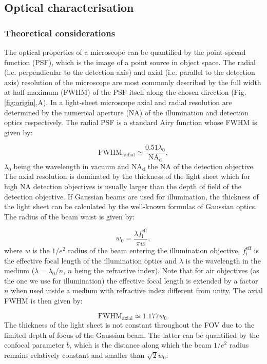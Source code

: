 \documentclass[12pt]{spieman}  %
\begin{document}
\begin{spacing}{2}
\subsection{Optical characterisation}
\label{sec:characterisation}
\subsubsection{Theoretical considerations}

The optical properties of a microscope can be quantified by the point-spread function (PSF), which is the image of a point source in object space. The radial (i.e. perpendicular to the detection axis) and axial (i.e. parallel to the detection axis) resolution of the microscope are most commonly described by the full width at half-maximum (FWHM) of the PSF itself along the chosen direction (Fig. \ref{fig:origin},A). In a light-sheet microscope axial and radial resolution are determined by the numerical aperture (NA) of the illumination and detection optics respectively. The radial PSF is a standard Airy function whose FWHM is given by:

\begin{equation}
\text{FWHM}_{\text{radial}} \simeq \frac{0.51 \lambda_0}{\text{NA}_{\text{d}}},
\end{equation}
$\lambda_0$ being the wavelength in vacuum and $\text{NA}_{\text{d}}$ the NA of the detection objective. The axial resolution is dominated by the thickness of the light sheet which for high NA detection objectives is usually larger than the depth of field of the detection objective. If Gaussian beams are used for illumination, the thickness of the light sheet can be calculated by the well-known formulas of Gaussian optics\cite{Teich}. The radius of the beam waist is given by:

\begin{equation}
w_0 = \frac{\lambda f_{\text{i}}^{\text{eff}}}{\pi w},
\end{equation}
where $w$ is the $1/e^2$ radius of the beam entering the illumination objective, $ f_{\text{i}}^{\text{eff}}$ is the effective focal length of the illumination optics and $\lambda$ is the wavelength in the medium ($\lambda = \lambda_0 / n$, $n$ being the refractive index). Note that for air objectives (as the one we use for illumination) the effective focal length is extended by a factor $n$ when used inside a medium with refractive index different from unity\cite{Silvestri2012}.
The axial FWHM is then given by:

\begin{equation}
\text{FWHM}_{\text{axial}} \simeq 1.177 w_0.
\end{equation}
The thickness of the light sheet is not constant throughout the FOV due to the limited depth of focus of the Gaussian beam. The latter can be quantified by the confocal parameter $b$, which is the distance along which the beam $1/e^2$ radius remains relatively constant and smaller than $\sqrt{2} w_0$:


\end{spacing}
\end{document}
